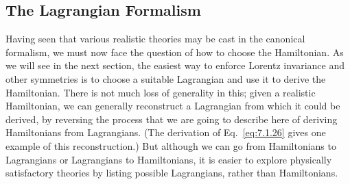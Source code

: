 
\subsection{The Lagrangian Formalism}

Having seen that various realistic theories may be cast in the canonical
formalism, we must now face the question of how to choose the Hamiltonian.
As we will see in the next section, the easiest way to enforce Lorentz
invariance and other symmetries is to choose a suitable Lagrangian and use
it to derive the Hamiltonian. There is not much loss of generality in this;
given a realistic Hamiltonian, we can generally reconstruct a Lagrangian
from which it could be derived, by reversing the process that we are
going to describe here of deriving Hamiltonians from Lagrangians. (The
derivation of Eq.~\eqref{eq:7.1.26} gives one example of this reconstruction.) But
although we can go from Hamiltonians to Lagrangians or Lagrangians
to Hamiltonians, it is easier to explore physically satisfactory theories by
listing possible Lagrangians, rather than Hamiltonians.

